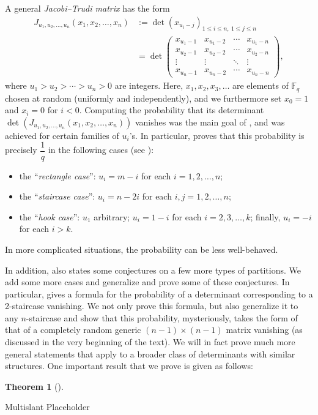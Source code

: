 \documentclass[numbers=enddot,12pt,final,onecolumn,notitlepage]{scrartcl}%
\theoremstyle{definition}
\newtheorem{theo}{Theorem}[section]
\newenvironment{theorem}[1][]
{\begin{theo}[#1]\begin{leftbar}}
{\end{leftbar}\end{theo}}
\newcommand{\tup}[1]{\left( #1 \right)}
\newcommand{\Fq}{\mathbb{F}_q}
\renewcommand{\leq}{\leqslant}
\theoremstyle{plainsl}
\begin{document}
A general \emph{Jacobi--Trudi matrix} has the form
\begin{align*}
J_{u_1, u_2, \ldots, u_n}\tup{x_1, x_2, \ldots, x_n}
&:=
\det \left(  x_{u_{i}-j}\right)_{1\leq i\leq n,\ 1\leq j\leq n}
\\
&= \det \begin{pmatrix}
x_{u_1 - 1} & x_{u_1 - 2} & \cdots & x_{u_1 - n} \\
x_{u_2 - 1} & x_{u_2 - 2} & \cdots & x_{u_2 - n} \\
\vdots & \vdots & \ddots & \vdots \\
x_{u_n - 1} & x_{u_n - 2} & \cdots & x_{u_n - n}
\end{pmatrix} ,
\end{align*}
where $u_{1}>u_{2}>\cdots>u_{n}>0$ are integers.
Here, $x_1, x_2, x_3, \ldots$ are elements of $\Fq$ chosen at random (uniformly and independently), and we furthermore set $x_{0}=1$ and $x_{i}=0$ for $i<0$.
Computing the probability that its determinant
$\det\tup{ J_{u_1, u_2, \ldots, u_n}\tup{x_1, x_2, \ldots, x_n} }$
vanishes was the main goal of
\cite{Anzis18}, and was achieved for certain families of
$u_i$'s.
In particular, \cite{Anzis18} proves that this probability is precisely $\dfrac{1}{q}$ in the following cases (see \cite[Corollary 6.4, Theorem 6.5, Proposition 1.2]{Anzis18}):
\begin{itemize}
\item the ``\emph{rectangle case}'': $u_i = m - i$ for each $i = 1, 2, \ldots, n$;
\item the ``\emph{staircase case}'': $u_i = n - 2i$ for each $i,j = 1, 2, \ldots, n$;
\item the ``\emph{hook case}'': $u_1$ arbitrary; $u_i = 1 - i$ for
each $i = 2, 3, \ldots, k$; finally, $u_i = -i$ for each $i > k$.
\end{itemize}
In more complicated situations, the probability can be less well-behaved.



In addition, \cite{Anzis18} also states some conjectures on a few more types of partitions.
We add some more cases and generalize and prove some of these conjectures.
In particular, \cite[Conjecture 10.1]{Anzis18} gives a formula for the probability of a determinant corresponding to a 2-staircase vanishing. We not only prove this formula, but also generalize it to any $n$-staircase and show that this probability, mysteriously, takes the form of that of a completely random generic $(n-1)\times (n-1)$ matrix vanishing (as discussed in the very beginning of the text). We will in fact prove much more general statements that apply to a broader class of determinants with similar structures. One important result that we prove is given as follows:
\begin{theorem}
Multislant Placeholder
\end{theorem}
\end{document}
